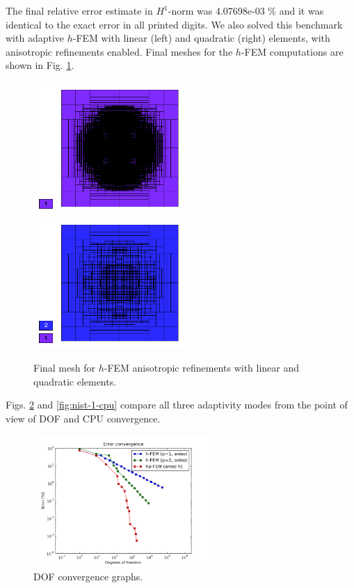 \documentclass[12pt]{elsarticle}
\begin{document}
The final relative error estimate in $H^1$-norm was 4.07698e-03 \%
and it was identical to the exact error in all printed digits.
We also solved this benchmark with adaptive $h$-FEM 
with linear (left) and quadratic (right)
elements, with anisotropic refinements enabled.
Final meshes for the $h$-FEM computations are shown 
in Fig. \ref{fig:nist-1-h-aniso}.

\begin{figure}[!ht]
\centering
\includegraphics[height=5cm]{nist/nist-1/mesh_h1_aniso.png}\ \
\includegraphics[height=5cm]{nist/nist-1/mesh_h2_aniso.png}
\vspace{-2mm}
\caption{Final mesh for $h$-FEM anisotropic refinements with linear and quadratic elements.}
\label{fig:nist-1-h-aniso}
\end{figure}

Figs. \ref{fig:nist-1-dof} and \ref{fig:nist-1-cpu} compare all
three adaptivity modes from the point
of view of DOF and CPU convergence.

\begin{figure}[!ht]
\centering
\includegraphics[height=5cm]{nist/nist-1/conv_dof_aniso.png}
\vspace{-2mm}
\caption{DOF convergence graphs.}
\label{fig:nist-1-dof}
\end{figure}
\end{document}
